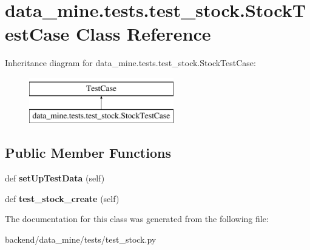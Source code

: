 \hypertarget{classdata__mine_1_1tests_1_1test__stock_1_1_stock_test_case}{}\section{data\+\_\+mine.\+tests.\+test\+\_\+stock.\+Stock\+Test\+Case Class Reference}
\label{classdata__mine_1_1tests_1_1test__stock_1_1_stock_test_case}
Inheritance diagram for data\+\_\+mine.\+tests.\+test\+\_\+stock.\+Stock\+Test\+Case\+:\begin{figure}[H]
\begin{center}
\leavevmode
\includegraphics[height=2.000000cm]{classdata__mine_1_1tests_1_1test__stock_1_1_stock_test_case}
\end{center}
\end{figure}
\subsection*{Public Member Functions}
\begin{DoxyCompactItemize}
\item 
\mbox{\label{classdata__mine_1_1tests_1_1test__stock_1_1_stock_test_case_abaeea6624818de33babf97a7f998ac17}} 
def {\bfseries set\+Up\+Test\+Data} (self)
\item 
\mbox{\label{classdata__mine_1_1tests_1_1test__stock_1_1_stock_test_case_abde0115a4959c0a54133efdab742993c}} 
def {\bfseries test\+\_\+stock\+\_\+create} (self)
\end{DoxyCompactItemize}


The documentation for this class was generated from the following file\+:\begin{DoxyCompactItemize}
\item 
backend/data\+\_\+mine/tests/test\+\_\+stock.\+py\end{DoxyCompactItemize}
